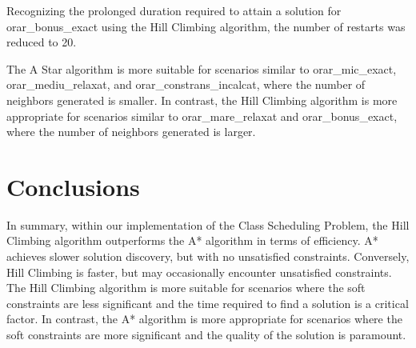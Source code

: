 \documentclass[runningheads]{paper}
\begin{document}
Recognizing the prolonged duration required to attain a solution for 
orar\_bonus\_exact using the Hill Climbing algorithm, the number of 
restarts was reduced to 20.

The A Star algorithm is more suitable for scenarios similar to orar\_mic\_exact,
orar\_mediu\_relaxat, and orar\_constrans\_incalcat, where the number of
neighbors generated is smaller. In contrast, the Hill Climbing algorithm is
more appropriate for scenarios similar to orar\_mare\_relaxat and orar\_bonus\_exact,
where the number of neighbors generated is larger.

\section{Conclusions}

In summary, within our implementation of the Class Scheduling Problem, 
the Hill Climbing algorithm outperforms the A* algorithm in terms of efficiency.
A* achieves slower solution discovery, but with no unsatisfied constraints. 
Conversely, Hill Climbing is faster, but may occasionally encounter unsatisfied
constraints. The Hill Climbing algorithm is more suitable for scenarios where
the soft constraints are less significant and the time required to find a
solution is a critical factor. In contrast, the A* algorithm is more appropriate
for scenarios where the soft constraints are more significant and the quality of
the solution is paramount.


\pagebreak
\end{document}
